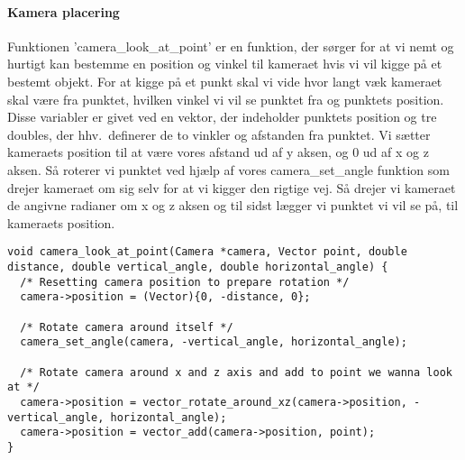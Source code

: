 \paragraph{Kamera placering}

Funktionen 'camera\_look\_at\_point' er en funktion, der sørger for at vi nemt og hurtigt kan bestemme en position og vinkel til kameraet hvis vi vil kigge på et bestemt objekt. 
For at kigge på et punkt skal vi vide hvor langt væk kameraet skal være fra punktet, hvilken vinkel vi vil se punktet fra og punktets position. Disse variabler er givet ved en vektor, der indeholder punktets position og tre doubles, der hhv.\ definerer de to vinkler og afstanden fra punktet.
Vi sætter kameraets position til at være vores afstand ud af y aksen, og 0 ud af x og z aksen. Så roterer vi punktet ved hjælp af vores camera\_set\_angle funktion som drejer kameraet om sig selv for at vi kigger den rigtige vej.
Så drejer vi kameraet de angivne radianer om x og z aksen og til sidst lægger vi punktet vi vil se på, til kameraets position.

\begin{lstlisting}[style=Cstyle, caption=Kode-uddrag fra camera.c: camera\_look\_at\_point]
void camera_look_at_point(Camera *camera, Vector point, double distance, double vertical_angle, double horizontal_angle) {
  /* Resetting camera position to prepare rotation */
  camera->position = (Vector){0, -distance, 0};

  /* Rotate camera around itself */
  camera_set_angle(camera, -vertical_angle, horizontal_angle);
  
  /* Rotate camera around x and z axis and add to point we wanna look at */
  camera->position = vector_rotate_around_xz(camera->position, -vertical_angle, horizontal_angle);
  camera->position = vector_add(camera->position, point);
}
\end{lstlisting}